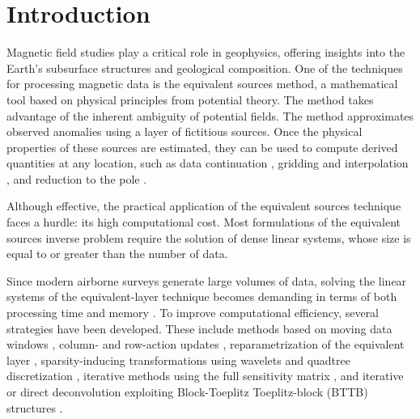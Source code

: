 \section{Introduction}

Magnetic field studies play a critical role in geophysics, offering insights
into the Earth's subsurface structures and geological composition.
One of the techniques for processing magnetic data is the equivalent
sources method, a mathematical tool based on physical principles from potential
theory.
The method takes advantage of the inherent ambiguity of potential fields.
The method approximates observed anomalies using a layer of fictitious sources.
Once the physical properties of these sources are estimated, they can be used
to compute derived quantities at any location, such as data continuation
\citep{Emilia1973, ZhiWen2022, Li2023}, gridding and interpolation
\citep{Mendonca1994, Mendonca1995, Dampney1969, Li2006, Cordell1992, Ebbing2021}, and
reduction to the pole \citep{Guspi2009, Li2001, Silva1986}.

Although effective, the practical application of the equivalent sources
technique faces a hurdle: its high computational cost.
Most formulations of the equivalent sources inverse problem require the
solution of dense linear systems, whose size is equal to or greater than the
number of data.

Since modern airborne surveys generate large volumes of data,
solving the linear systems of the equivalent-layer technique becomes
demanding in terms of both processing time and memory
\citep{OliveiraJunior2023}. To improve computational efficiency,
several strategies have been developed. These include methods
based on moving data windows \citep{Leao1989,Soler2021,Uppal2025},
column- and row-action updates \citep{Cordell1992,Mendonca1994,Guspi2009},
re\-para\-me\-trization of the equivalent layer \citep{OliveiraJr2013,Mendonca2020},
sparsity-inducing transformations using wavelets and quadtree discretization
\citep{Li2010,Barnes2011}, iterative methods using the full sensitivity matrix
\citep{Xia1991,Xia1993,Siqueira2017,Jirigalatu2019}, and iterative or direct
deconvolution exploiting Block-Toeplitz Toeplitz-block (BTTB) structures
\citep{Takahashi2020,Takahashi2022}.

